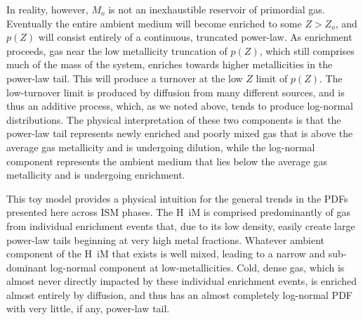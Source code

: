 \documentclass[twocolumn]{aastex61}
\begin{document}
In reality, however, $M_o$ is not an inexhaustible reservoir of primordial gas. Eventually the entire ambient medium will become enriched to some $Z > Z_o$, and $p(Z)$ will consist entirely of a continuous, truncated power-law. As enrichment proceeds, gas near the low metallicity truncation of $p(Z)$, which still comprises much of the mass of the system, enriches towards higher metallicities in the power-law tail. This will produce a turnover at the low $Z$ limit of $p(Z)$. The low-turnover limit is produced by diffusion from many different sources, and is thus an additive process, which, as we noted above, tends to produce log-normal distributions. The physical interpretation of these two components is that the power-law tail represents newly enriched and poorly mixed gas that is above the average gas metallicity and is undergoing dilution, while the log-normal component represents the ambient medium that lies below the average gas metallicity and is undergoing enrichment.

This toy model provides a physical intuition for the general trends in the PDFs presented here across ISM phases. The H~{\sc i}M is comprised predominantly of gas from individual enrichment events that, due to its low density, easily create large power-law tails beginning at very high metal fractions. Whatever ambient component of the H~{\sc i}M that exists is well mixed, leading to a narrow and sub-dominant log-normal component at low-metallicities. Cold, dense gas, which is almost never directly impacted by these individual enrichment events, is enriched almost entirely by diffusion, and thus has an almost completely log-normal PDF with very little, if any, power-law tail. 

%
%
%
\end{document}
